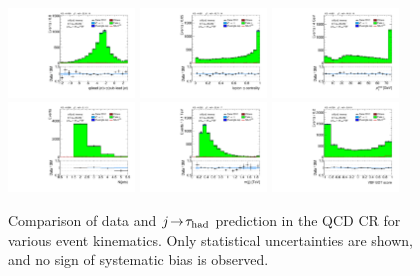 \begin{figure}[tp]
  \includegraphics[width=0.30\textwidth]{figures/analysis/vbf-QCDCR/jets-etaprod}
  \includegraphics[width=0.30\textwidth]{figures/analysis/vbf-QCDCR/lep-eta-centrality}
  \includegraphics[width=0.30\textwidth]{figures/analysis/vbf-QCDCR/system-pt} \\
  \includegraphics[width=0.30\textwidth]{figures/analysis/vbf-QCDCR/n-jets30}
  \includegraphics[width=0.30\textwidth]{figures/analysis/vbf-QCDCR/dijet-m-veryhigh}
  \includegraphics[width=0.30\textwidth]{figures/analysis/vbf-QCDCR/BDTEve-VBF} \\
  \caption{Comparison of data and $j\!\rightarrow\!\tau_\text{had}$ prediction in the QCD CR for various event kinematics. Only statistical uncertainties are shown, and no sign of systematic bias is observed.}
  \label{fig:backgrounds-QCDCR-jets}
\end{figure}

